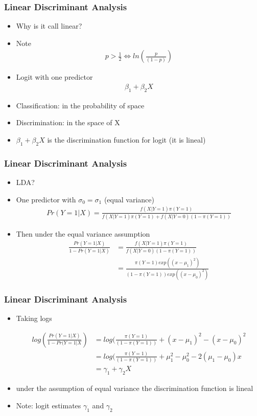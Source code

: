 \documentclass[
  shownotes,
  xcolor={svgnames},
  hyperref={colorlinks,citecolor=DarkBlue,linkcolor=andesred,urlcolor=DarkBlue}
  , aspectratio=169]{beamer}
\begin{document}
\begin{frame}[fragile]
\frametitle{Linear Discriminant Analysis}

\begin{itemize}
  \item Why is it call linear?
  \item Note
  \begin{align}
    p>\frac{1}{2} \iff ln(\frac{p}{(1-p)})
  \end{align}
  \item Logit with one predictor
  \begin{align}
  \beta_1 + \beta_2 X
  \end{align}
  \item Classification: in the probability of space
  \item Discrimination: in the space of X
  \item $\beta_1 +\beta_2 X$ is the discrimination function for logit (it is lineal)
\end{itemize}

\end{frame}
\begin{frame}[fragile]
\frametitle{Linear Discriminant Analysis}
\begin{itemize}
  \item LDA?
  \item One predictor with $\sigma_0 = \sigma_1$ (equal variance)
  \begin{align}
  Pr (Y=1|X)=\frac{f(X|Y=1)\pi(Y=1)}{f(X|Y=1)\pi(Y=1) + f(X|Y=0)(1-\pi(Y=1))}
  \end{align}
  \item Then under the equal variance assumption
  \begin{align}
  \frac{Pr (Y=1|X)}{1-Pr(Y=1|X)} &= \frac{f(X|Y=1)\pi(Y=1)}{f(X|Y=0)(1-\pi(Y=1))} \\
                                &= \frac{\pi(Y=1)exp((x-\mu_1)^2)}{(1-\pi(Y=1))exp((x-\mu_0)^2)} 
  \end{align}
\end{itemize}

\end{frame}
\begin{frame}[fragile]
\frametitle{Linear Discriminant Analysis}
\begin{itemize}
  \item Taking logs

\begin{align}
  log \left( \frac{Pr(Y=1|X)}{1-Pr(Y=1|X}\right)  &= log(\frac{\pi(Y=1)}{(1-\pi(Y=1))}+(x-\mu_1)^2-(x-\mu_0)^2 \\
  &= log(\frac{\pi(Y=1)}{(1-\pi(Y=1))}+\mu^2_1-\mu^2_0-2(\mu_1-\mu_0)x \\
  &= \gamma_1 +\gamma_2 X
  \end{align}  
  \item under the assumption of equal variance the discrimination function is lineal
  \item Note: logit estimates $\gamma_1$ and $\gamma_2$
\end{itemize}
\end{frame}
\end{document}
